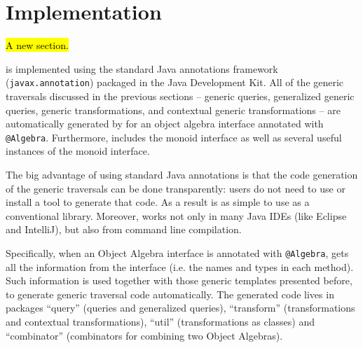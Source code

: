 \section{\name Implementation}

\hl{A new section.}

\name is implemented using the standard Java annotations framework
(\lstinline{javax.annotation}) packaged in the Java Development Kit.
All of the generic traversals discussed in the previous sections --
generic queries, generalized generic queries, generic transformations,
and contextual generic transformations -- are automatically generated
by \name for an object algebra interface annotated with \lstinline{@Algebra}.
Furthermore, \name includes the monoid interface as well as several
useful instances of the monoid interface.

The big advantage of using standard Java annotations is that the code generation of the generic traversals can be done transparently: users do not need to use or install a tool to generate that code. As a result \name is as simple to use as a conventional library. Moreover, \name works not only in many Java IDEs (like Eclipse and IntelliJ), but also from command line compilation.

Specifically, when an Object Algebra interface is annotated with \lstinline{@Algebra}, \name gets all the information from the interface (i.e. the names and types in each method). Such information is used together with those generic templates presented before, to generate generic traversal code automatically. The generated code lives in packages ``query'' (queries and generalized queries), ``transform'' (transformations and contextual transformations), ``util'' (transformations as classes) and ``combinator'' (combinators for combining two Object Algebras).

